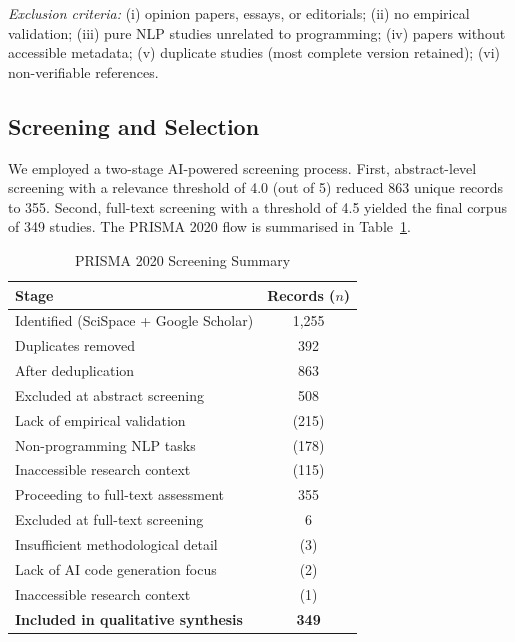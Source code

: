 \documentclass[journal,twoside,10pt]{IEEEtran}
\begin{document}
\textit{Exclusion criteria:} (i) opinion papers, essays, or editorials;
(ii) no empirical validation; (iii) pure NLP studies unrelated to programming;
(iv) papers without accessible metadata; (v) duplicate studies (most complete
version retained); (vi) non-verifiable references.

\subsection{Screening and Selection}

We employed a two-stage AI-powered screening process. First, abstract-level
screening with a relevance threshold of 4.0 (out of 5) reduced 863 unique
records to 355. Second, full-text screening with a threshold of 4.5 yielded
the final corpus of 349 studies. The PRISMA 2020 flow is summarised in
Table~\ref{tab:prisma}.

\begin{table}[!t]
  \caption{PRISMA 2020 Screening Summary}
  \label{tab:prisma}
  \centering
  \renewcommand{\arraystretch}{1.2}
  \begin{tabular}{lc}
    \toprule
    \textbf{Stage} & \textbf{Records ($n$)} \\
    \midrule
    Identified (SciSpace + Google Scholar) & 1,255 \\
    Duplicates removed                     & 392   \\
    After deduplication                    & 863   \\
    Excluded at abstract screening         & 508   \\
    \quad Lack of empirical validation     & (215) \\
    \quad Non-programming NLP tasks        & (178) \\
    \quad Inaccessible research context    & (115) \\
    Proceeding to full-text assessment     & 355   \\
    Excluded at full-text screening        & 6     \\
    \quad Insufficient methodological detail & (3) \\
    \quad Lack of AI code generation focus & (2)   \\
    \quad Inaccessible research context    & (1)   \\
    \textbf{Included in qualitative synthesis} & \textbf{349} \\
    \bottomrule
  \end{tabular}
\end{table}
\end{document}
